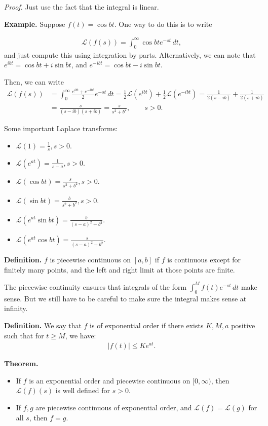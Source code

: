 \documentclass{article}
\newcommand{\LL}{\mathcal{L}}
\begin{document}
{\it Proof.} Just use the fact that the integral is linear.

{\bf Example.} Suppose $f(t) = \cos bt$.  One way to do this is to write

\begin{align*}
  \LL(f(s)) = \int_{0}^{\infty} \cos bt e^{-st} \, dt,
\end{align*}
and just compute this using integration by parts.  Alternatively, we can note that $e^{ibt} = \cos bt + i \sin bt$, and $e^{-ibt} = \cos bt - i \sin bt$.

Then, we can write
\begin{align*}
  \LL(f(s)) &= \int_{0}^{\infty} \frac{e^{ibt} + e^{-ibt}}{2} e^{-st} \, dt = \frac{1}{2} \LL(e^{ibt}) + \frac{1}{2} \LL \left( e^{-ibt} \right) = \frac{1}{2(s - ib)}  + \frac{1}{2(s + ib)} \\
  &= \frac{s}{(s - ib)(s+ib)} = \frac{s}{s^2 + b^2}, \qquad s > 0.
\end{align*}

Some important Laplace transforms:

\begin{itemize}
  \item $\LL (1) = \frac{1}{s}, s > 0$.
  \item $\LL (e^{at}) = \frac{1}{s-a}, s > 0$.
  \item $\LL (\cos bt) = \frac{s}{s^2 + b^2}, s > 0$.
  \item $\LL (\sin bt) = \frac{b}{s^2 + b^2}, s > 0$.
  \item $\LL(e^{at} \sin bt) = \frac{b}{(s - a)^2 + b^2}$.
  \item $\LL (e^{at} \cos bt) = \frac{s}{(s - a)^2 + b^2}$.
\end{itemize}

{\bf Definition.} $f$ is piecewise continuous on $[a, b]$ if $f$ is continuous except for finitely many points, and the left and right limit at those points are finite.

The piecewise continuity ensures that integrals of the form $\int_{0}^{M}  f(t) e^{-st} \, dt$ make sense.  But we still have to be careful to make sure the integral makes sense at infinity.

{\bf Definition.} We say that $f$ is of exponential order if there exists $K, M, a$ positive such that for $t \geq M$, we have:
\begin{align*}
  |f(t) | \leq K e^{at}.
\end{align*}

{\bf Theorem.} 
\begin{itemize}
  \item If $f$ is an exponential order and piecewise continuous on $[0, \infty)$, then $\LL (f)(s)$ is well defined for $s > 0$.
  \item If $f, g$ are piecewise continuous of exponential order, and $\LL(f) = \LL(g)$ for all $s$, then $f = g$.
\end{itemize}
\end{document}

